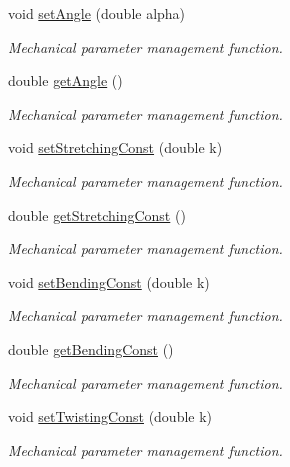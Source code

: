 \begin{DoxyCompactItemize}
\item 
void \hyperlink{classMCylinder_ab49ff16095c669f3a3dc4866597c13e7}{set\+Angle} (double alpha)
\begin{DoxyCompactList}\small\item\em Mechanical parameter management function. \end{DoxyCompactList}\item 
double \hyperlink{classMCylinder_aaf9f88afc648aa965028f64163c8d336}{get\+Angle} ()
\begin{DoxyCompactList}\small\item\em Mechanical parameter management function. \end{DoxyCompactList}\item 
void \hyperlink{classMCylinder_af9a3d6741a8cf7b72d983d0b25446092}{set\+Stretching\+Const} (double k)
\begin{DoxyCompactList}\small\item\em Mechanical parameter management function. \end{DoxyCompactList}\item 
double \hyperlink{classMCylinder_a46afbfa5fa8050dee247c1a91b9bd2d6}{get\+Stretching\+Const} ()
\begin{DoxyCompactList}\small\item\em Mechanical parameter management function. \end{DoxyCompactList}\item 
void \hyperlink{classMCylinder_a441c75cb7dcafe33de0dcb04ac839eb9}{set\+Bending\+Const} (double k)
\begin{DoxyCompactList}\small\item\em Mechanical parameter management function. \end{DoxyCompactList}\item 
double \hyperlink{classMCylinder_aab0e5ecedb045b81c1bb0d42bbe1c55a}{get\+Bending\+Const} ()
\begin{DoxyCompactList}\small\item\em Mechanical parameter management function. \end{DoxyCompactList}\item 
void \hyperlink{classMCylinder_ae68ccc14047ef0ece414e967dd7364f4}{set\+Twisting\+Const} (double k)
\begin{DoxyCompactList}\small\item\em Mechanical parameter management function. \end{DoxyCompactList}\item 

\end{DoxyCompactItemize}
